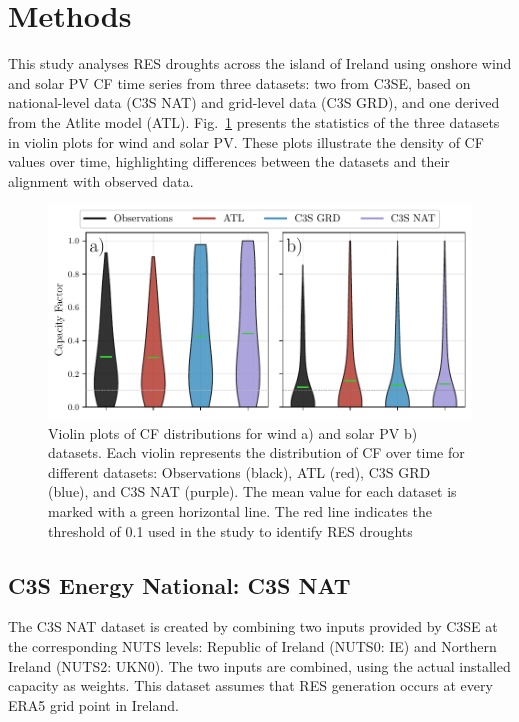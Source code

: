 \documentclass[preprint, 12pt]{elsarticle}
\begin{document}
\section{Methods}
\label{sec:methods}

This study analyses RES droughts across the island of Ireland using onshore wind and solar PV CF time series from three datasets: two from C3SE, based on national-level data (C3S NAT) and grid-level data (C3S GRD), and one derived from the Atlite model (ATL). Fig.~\ref{fig:violin_plots} presents the statistics of the three datasets in violin plots for wind and solar PV. These plots illustrate the density of CF values over time, highlighting differences between the datasets and their alignment with observed data. 

\begin{figure}[ht!]
	\centering
	\includegraphics[width=\textwidth]{violin_plots_verification.pdf}
	\caption{Violin plots of CF distributions for wind a) and solar PV b) datasets. Each violin represents the distribution of CF over time for different datasets: Observations (black), ATL (red), C3S GRD (blue), and C3S NAT (purple). The mean value for each dataset is marked with a green horizontal line. The red line indicates the threshold of 0.1 used in the study to identify RES droughts}
	\label{fig:violin_plots}
\end{figure}

\subsection{C3S Energy National: C3S NAT}
\label{sec:c3se_n}

The C3S NAT dataset is created by combining two inputs provided by C3SE at the corresponding NUTS levels: Republic of Ireland (NUTS0: IE) and Northern Ireland (NUTS2: UKN0). The two inputs are combined, using the actual installed capacity as weights. This dataset assumes that RES generation occurs at every ERA5 grid point in Ireland. 
\end{document}
